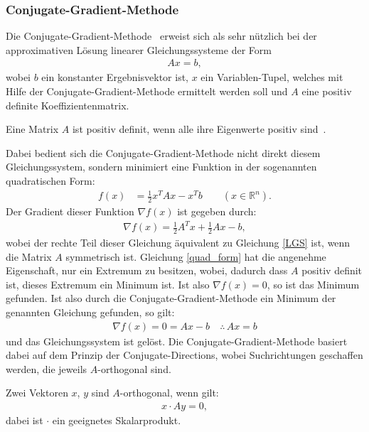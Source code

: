 \subsubsection{Conjugate-Gradient-Methode}

Die Conjugate-Gradient-Methode~\cite[nach][]{shewchuk_introduction_1994} erweist sich als sehr nützlich bei der approximativen Lösung linearer Gleichungssysteme der Form
\begin{align}
    Ax=b \label{LGS},
\end{align}
wobei $b$ ein konstanter Ergebnisvektor ist, $x$ ein Variablen-Tupel, welches mit Hilfe der Conjugate-Gradient-Methode ermittelt werden soll und $A$ eine positiv definite Koeffizientenmatrix.
\begin{Definition}
    Eine Matrix $A$ ist positiv definit, wenn alle ihre Eigenwerte positiv sind~\cite[S. 69]{kunath_reelle_2022}.
\end{Definition}
Dabei bedient sich die Conjugate-Gradient-Methode nicht direkt diesem Gleichungssystem, sondern minimiert eine Funktion in der sogenannten quadratischen Form:
\begin{align}
    f(x)&=\frac{1}{2}x^T A x - x^T b \qquad (x \in \mathbb{R}^n). \label{quad_form}
\end{align}
Der Gradient dieser Funktion $\nabla f(x)$ ist gegeben durch:
\begin{align*}
    \nabla f(x) = \frac{1}{2} A^T x + \frac{1}{2}Ax - b,
\end{align*}
wobei der rechte Teil dieser Gleichung äquivalent zu Gleichung \eqref{LGS} ist, wenn die Matrix $A$ symmetrisch ist. Gleichung \eqref{quad_form} hat die angenehme Eigenschaft, nur ein Extremum zu besitzen, wobei, dadurch dass $A$ positiv definit ist, dieses Extremum ein Minimum ist. Ist also $\nabla f(x)=0$, so ist das Minimum gefunden. Ist also durch die Conjugate-Gradient-Methode ein Minimum der genannten Gleichung gefunden, so gilt:
\begin{align*}
    \nabla f(x)=0=Ax-b \quad \therefore \, Ax=b %
\end{align*}
und das Gleichungssystem ist gelöst.
Die Conjugate-Gradient-Methode basiert dabei auf dem Prinzip der Conjugate-Directions, wobei Suchrichtungen geschaffen werden, die jeweils $A$-orthogonal sind.
\begin{Definition}
    Zwei Vektoren $x$, $y$ sind $A$-orthogonal, wenn gilt:
    \begin{align*}
        x\cdot Ay = 0,
    \end{align*}
    dabei ist $\cdot$ ein geeignetes Skalarprodukt.
\end{Definition}
